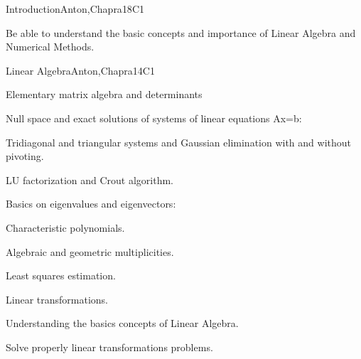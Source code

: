 \begin{syllabus}
\begin{unit}{Introduction}{}{Anton,Chapra}{18}{C1}
   \begin{learningoutcomes}
      \item Be able to understand the basic concepts and importance of Linear Algebra and Numerical Methods.
   \end{learningoutcomes}
\end{unit}

\begin{unit}{Linear Algebra}{}{Anton,Chapra}{14}{C1}
   \begin{topics}
    \item Elementary matrix algebra and determinants
    \item Null space and exact solutions of systems of linear equations Ax=b:
	  \begin{subtopics}
	    \item Tridiagonal and triangular systems and Gaussian elimination with and without pivoting.
	    \item LU factorization and Crout algorithm.
	  \end{subtopics}
    \item Basics on eigenvalues and eigenvectors:	  
	  \begin{subtopics}
	    \item Characteristic polynomials.
	    \item Algebraic and geometric multiplicities.
	  \end{subtopics}
    \item Least squares estimation.
    \item Linear transformations.
    \end{topics}

   \begin{learningoutcomes}
      \item Understanding the basics concepts of Linear Algebra.
      \item Solve properly linear transformations problems.
      \end{learningoutcomes}
\end{unit}


\end{syllabus}
